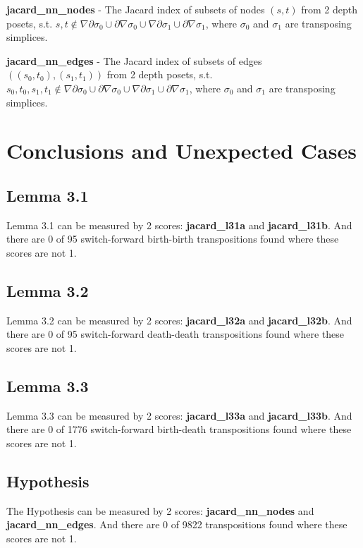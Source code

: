 \documentclass{article}
\begin{document}
\par \textbf{jacard\_nn\_nodes} -
The Jacard index of subsets of nodes $(s, t)$ from 2 depth posets, s.t.
$s, t \notin \nabla\partial\sigma_0 \cup \partial\nabla\sigma_0 \cup \nabla\partial\sigma_1 \cup \partial\nabla\sigma_1$,
where $\sigma_0$ and $\sigma_1$ are transposing simplices.


\par \textbf{jacard\_nn\_edges} -
The Jacard index of subsets of edges $((s_0, t_0), (s_1, t_1))$ from 2 depth posets, s.t.
$s_0, t_0, s_1, t_1 \notin \nabla\partial\sigma_0 \cup \partial\nabla\sigma_0 \cup \nabla\partial\sigma_1 \cup \partial\nabla\sigma_1$,
where $\sigma_0$ and $\sigma_1$ are transposing simplices.



\section{Conclusions and Unexpected Cases}
\subsection{Lemma 3.1}

\par Lemma 3.1 can be measured by 2 scores: \textbf{jacard\_l31a} and \textbf{jacard\_l31b}.
And there are 0 of 95 switch-forward birth-birth transpositions found where these scores are not 1.

\subsection{Lemma 3.2}

\par Lemma 3.2 can be measured by 2 scores: \textbf{jacard\_l32a} and \textbf{jacard\_l32b}.
And there are 0 of 95 switch-forward death-death transpositions found where these scores are not 1.

\subsection{Lemma 3.3}

\par Lemma 3.3 can be measured by 2 scores: \textbf{jacard\_l33a} and \textbf{jacard\_l33b}.
And there are 0 of 1776 switch-forward birth-death transpositions found where these scores are not 1.

\subsection{Hypothesis}

\par The Hypothesis can be measured by 2 scores: \textbf{jacard\_nn\_nodes} and \textbf{jacard\_nn\_edges}.
And there are 0 of 9822 transpositions found where these scores are not 1.
\end{document}
